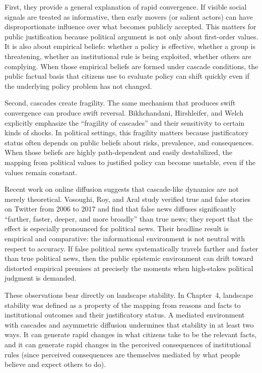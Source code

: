 \documentclass[12pt]{report}
\begin{document}
First, they provide a general explanation of rapid convergence. If visible social signals are treated as informative, then early movers (or salient actors) can have disproportionate influence over what becomes publicly accepted. This matters for public justification because political argument is not only about first-order values. It is also about empirical beliefs: whether a policy is effective, whether a group is threatening, whether an institutional rule is being exploited, whether others are complying. When those empirical beliefs are formed under cascade conditions, the public factual basis that citizens use to evaluate policy can shift quickly even if the underlying policy problem has not changed.

Second, cascades create fragility. The same mechanism that produces swift convergence can produce swift reversal. Bikhchandani, Hirshleifer, and Welch explicitly emphasize the \enquote{fragility of cascades} and their sensitivity to certain kinds of shocks.\parencite[p.~996]{bikhchandaniHirshleiferWelch1992cascades} In political settings, this fragility matters because justificatory status often depends on public beliefs about risks, prevalence, and consequences. When those beliefs are highly path-dependent and easily destabilized, the mapping from political values to justified policy can become unstable, even if the values remain constant.

Recent work on online diffusion suggests that cascade-like dynamics are not merely theoretical. Vosoughi, Roy, and Aral study verified true and false stories on Twitter from 2006 to 2017 and find that false news diffuses significantly \enquote{farther, faster, deeper, and more broadly} than true news; they report that the effect is especially pronounced for political news.\parencite[p.~1146]{vosoughiRoyAral2018falseNews} Their headline result is empirical and comparative: the informational environment is not neutral with respect to accuracy. If false political news systematically travels farther and faster than true political news, then the public epistemic environment can drift toward distorted empirical premises at precisely the moments when high-stakes political judgment is demanded.

These observations bear directly on landscape stability. In Chapter~4, landscape stability was defined as a property of the mapping from reasons and facts to institutional outcomes and their justificatory status. A mediated environment with cascades and asymmetric diffusion undermines that stability in at least two ways. It can generate rapid changes in what citizens take to be the relevant facts, and it can generate rapid changes in the perceived consequences of institutional rules (since perceived consequences are themselves mediated by what people believe and expect others to do).
\end{document}

